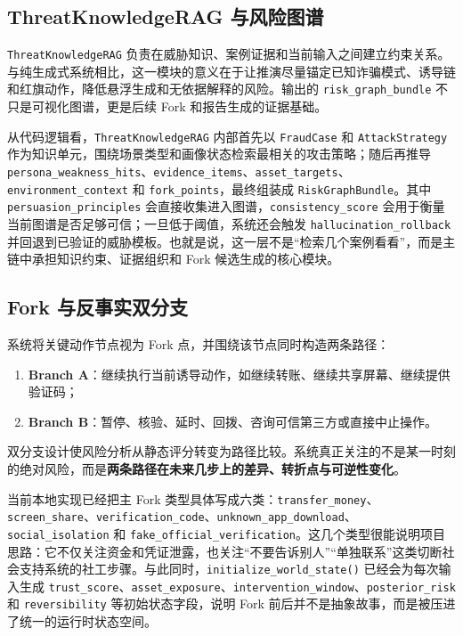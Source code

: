 \documentclass[12pt,a4paper]{ctexart}
\begin{document}
\subsection{ThreatKnowledgeRAG 与风险图谱}

\texttt{ThreatKnowledgeRAG} 负责在威胁知识、案例证据和当前输入之间建立约束关系。与纯生成式系统相比，这一模块的意义在于让推演尽量锚定已知诈骗模式、诱导链和红旗动作，降低悬浮生成和无依据解释的风险。输出的 \texttt{risk\_graph\_bundle} 不只是可视化图谱，更是后续 Fork 和报告生成的证据基础。

从代码逻辑看，\texttt{ThreatKnowledgeRAG} 内部首先以 \texttt{FraudCase} 和 \texttt{AttackStrategy} 作为知识单元，围绕场景类型和画像状态检索最相关的攻击策略；随后再推导 \texttt{persona\_weakness\_hits}、\texttt{evidence\_items}、\texttt{asset\_targets}、\texttt{environment\_context} 和 \texttt{fork\_points}，最终组装成 \texttt{RiskGraphBundle}。其中 \texttt{persuasion\_principles} 会直接收集进入图谱，\texttt{consistency\_score} 会用于衡量当前图谱是否足够可信；一旦低于阈值，系统还会触发 \texttt{hallucination\_rollback} 并回退到已验证的威胁模板。也就是说，这一层不是“检索几个案例看看”，而是主链中承担知识约束、证据组织和 Fork 候选生成的核心模块。

\subsection{Fork 与反事实双分支}

系统将关键动作节点视为 Fork 点，并围绕该节点同时构造两条路径：
\begin{enumerate}[leftmargin=2em]
  \item \textbf{Branch A}：继续执行当前诱导动作，如继续转账、继续共享屏幕、继续提供验证码；
  \item \textbf{Branch B}：暂停、核验、延时、回拨、咨询可信第三方或直接中止操作。
\end{enumerate}

双分支设计使风险分析从静态评分转变为路径比较。系统真正关注的不是某一时刻的绝对风险，而是\textbf{两条路径在未来几步上的差异、转折点与可逆性变化}。

当前本地实现已经把主 Fork 类型具体写成六类：\texttt{transfer\_money}、\texttt{screen\_share}、\texttt{verification\_code}、\texttt{unknown\_app\_download}、\texttt{social\_isolation} 和 \texttt{fake\_official\_verification}。这几个类型很能说明项目思路：它不仅关注资金和凭证泄露，也关注“不要告诉别人”“单独联系”这类切断社会支持系统的社工步骤。与此同时，\texttt{initialize\_world\_state()} 已经会为每次输入生成 \texttt{trust\_score}、\texttt{asset\_exposure}、\texttt{intervention\_window}、\texttt{posterior\_risk} 和 \texttt{reversibility} 等初始状态字段，说明 Fork 前后并不是抽象故事，而是被压进了统一的运行时状态空间。
\end{document}
